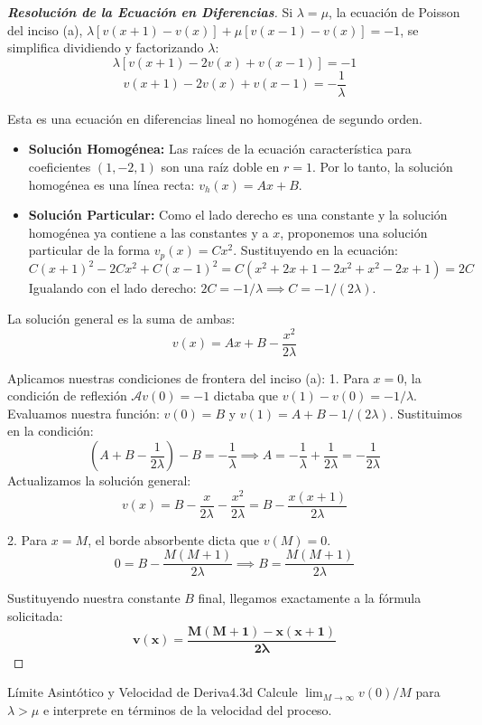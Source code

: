 \documentclass[10pt,a4paper]{article}
\begin{document}
\begin{proof}[\textbf{Resolución de la Ecuación en Diferencias}]
    Si $\lambda = \mu$, la ecuación de Poisson del inciso (a), $\lambda[v(x+1) - v(x)] + \mu[v(x-1) - v(x)] = -1$, se simplifica dividiendo y factorizando $\lambda$:
    \[ \lambda [v(x+1) - 2v(x) + v(x-1)] = -1 \]
    \[ v(x+1) - 2v(x) + v(x-1) = -\frac{1}{\lambda} \]
    
    Esta es una ecuación en diferencias lineal no homogénea de segundo orden. 
    \begin{itemize}
        \item \textbf{Solución Homogénea:} Las raíces de la ecuación característica para coeficientes $(1, -2, 1)$ son una raíz doble en $r=1$. Por lo tanto, la solución homogénea es una línea recta: $v_h(x) = Ax + B$.
        \item \textbf{Solución Particular:} Como el lado derecho es una constante y la solución homogénea ya contiene a las constantes y a $x$, proponemos una solución particular de la forma $v_p(x) = Cx^2$. 
        Sustituyendo en la ecuación:
        \[ C(x+1)^2 - 2Cx^2 + C(x-1)^2 = C(x^2+2x+1 - 2x^2 + x^2-2x+1) = 2C \]
        Igualando con el lado derecho: $2C = -1/\lambda \implies C = -1/(2\lambda)$.
    \end{itemize}
    
    La solución general es la suma de ambas:
    \[ v(x) = Ax + B - \frac{x^2}{2\lambda} \]
    
    Aplicamos nuestras condiciones de frontera del inciso (a):
    1. Para $x=0$, la condición de reflexión $\mathcal{A}v(0) = -1$ dictaba que $v(1) - v(0) = -1/\lambda$. 
    Evaluamos nuestra función: $v(0) = B$ y $v(1) = A + B - 1/(2\lambda)$.
    Sustituimos en la condición:
    \[ (A + B - \frac{1}{2\lambda}) - B = -\frac{1}{\lambda} \implies A = -\frac{1}{\lambda} + \frac{1}{2\lambda} = -\frac{1}{2\lambda} \]
    Actualizamos la solución general:
    \[ v(x) = B - \frac{x}{2\lambda} - \frac{x^2}{2\lambda} = B - \frac{x(x+1)}{2\lambda} \]
    
    2. Para $x=M$, el borde absorbente dicta que $v(M) = 0$.
    \[ 0 = B - \frac{M(M+1)}{2\lambda} \implies B = \frac{M(M+1)}{2\lambda} \]
    
    Sustituyendo nuestra constante $B$ final, llegamos exactamente a la fórmula solicitada:
    \[ \mathbf{v(x) = \frac{M(M+1) - x(x+1)}{2\lambda}} \]
\end{proof}

\newpage

\begin{ejercicio}{Límite Asintótico y Velocidad de Deriva}{4.3d}
    Calcule $\lim_{M \to \infty} v(0)/M$ para $\lambda > \mu$ e interprete en términos de la velocidad del proceso.
\end{ejercicio}
\end{document}

